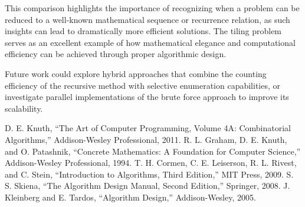\documentclass[conference]{IEEEtran}
\begin{document}
This comparison highlights the importance of recognizing when a problem can be reduced to a well-known mathematical sequence or recurrence relation, as such insights can lead to dramatically more efficient solutions. The tiling problem serves as an excellent example of how mathematical elegance and computational efficiency can be achieved through proper algorithmic design.

Future work could explore hybrid approaches that combine the counting efficiency of the recursive method with selective enumeration capabilities, or investigate parallel implementations of the brute force approach to improve its scalability.

\begin{thebibliography}{00}
 D. E. Knuth, ``The Art of Computer Programming, Volume 4A: Combinatorial Algorithms,'' Addison-Wesley Professional, 2011.
 R. L. Graham, D. E. Knuth, and O. Patashnik, ``Concrete Mathematics: A Foundation for Computer Science,'' Addison-Wesley Professional, 1994.
 T. H. Cormen, C. E. Leiserson, R. L. Rivest, and C. Stein, ``Introduction to Algorithms, Third Edition,'' MIT Press, 2009.
 S. S. Skiena, ``The Algorithm Design Manual, Second Edition,'' Springer, 2008.
 J. Kleinberg and E. Tardos, ``Algorithm Design,'' Addison-Wesley, 2005.
\end{thebibliography}
\end{document}
